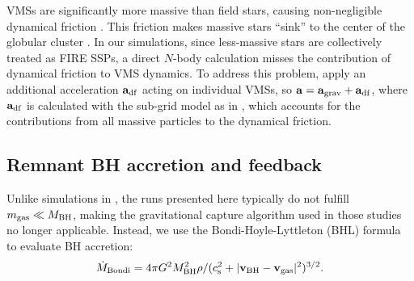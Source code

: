 \documentclass[twocolumn]{aastex631}
\begin{document}
VMSs are significantly more massive than field stars, causing non-negligible dynamical friction \citep{Chandrasekhar_1943ApJ....97..255C}. This friction makes massive stars ``sink'' to the center of the globular cluster \citep[e.g.][]{ShiGrudicHopkins_2021MNRAS.505.2753S}. In our simulations, since less-massive stars are collectively treated as FIRE SSPs, a direct $N$-body calculation misses the contribution of dynamical friction to VMS dynamics. To address this problem, apply an additional acceleration $\textbf{a}_{\rm df}$ acting on individual VMSs, so $\mathbf{a} = \mathbf{a}_{\rm grav} + \mathbf{a}_{\rm df}$, where $\mathbf{a}_{\rm df}$ is calculated with the sub-grid model as in \citet{MaHopkinsKelley_2023MNRAS.519.5543M}, which accounts for the contributions from all massive particles to the dynamical friction.

\subsection{Remnant BH accretion and feedback}

Unlike simulations in \citet{ShiKremerGrudic_2023MNRAS.518.3606S,ShiKremerHopkins_2024A&A...691A..24S}, the runs presented here typically do not fulfill $m_{\rm gas} \ll M_{\rm BH}$, making the gravitational capture algorithm used in those studies no longer applicable. Instead, we use the Bondi-Hoyle-Lyttleton (BHL) formula \citep{HoyleLyttleton_1939PCPS...35..405H,Bondi_1952MNRAS.112..195B} to evaluate BH accretion:
\begin{align}
    \dot M_{\rm Bondi} = 4\pi G^2 M_{\rm BH}^2 \rho/(c_{\rm s}^2+|\mathbf{v}_{\rm BH}-\mathbf{v}_{\rm gas}|^2)^{3/2}.
\end{align}
\end{document}
